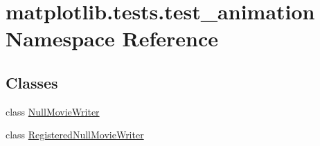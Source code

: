 \hypertarget{namespacematplotlib_1_1tests_1_1test__animation}{}\section{matplotlib.\+tests.\+test\+\_\+animation Namespace Reference}
\label{namespacematplotlib_1_1tests_1_1test__animation}
\subsection*{Classes}
\begin{DoxyCompactItemize}
\item 
class \hyperlink{classmatplotlib_1_1tests_1_1test__animation_1_1NullMovieWriter}{Null\+Movie\+Writer}
\item 
class \hyperlink{classmatplotlib_1_1tests_1_1test__animation_1_1RegisteredNullMovieWriter}{Registered\+Null\+Movie\+Writer}
\end{DoxyCompactItemize}
